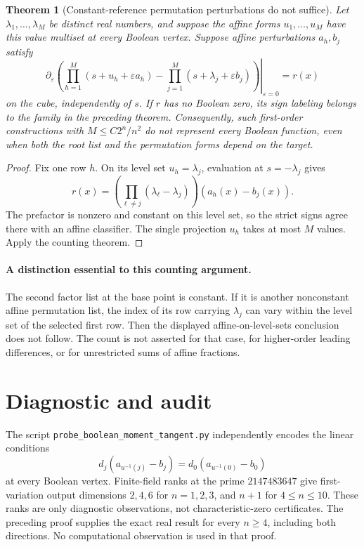 \documentclass[11pt]{article}
\newtheorem{theorem}{Theorem}
\begin{document}
\begin{theorem}[Constant-reference permutation perturbations do not suffice]
Let $\lambda_1,\ldots,\lambda_M$ be distinct real numbers, and suppose
the affine forms $u_1,\ldots,u_M$ have this value multiset at every
Boolean vertex. Suppose affine perturbations $a_h,b_j$ satisfy
\[
 \left.\partial_\varepsilon
 \left(\prod_{h=1}^M(s+u_h+\varepsilon a_h)
 -\prod_{j=1}^M(s+\lambda_j+\varepsilon b_j)\right)
 \right|_{\varepsilon=0}=r(x)
\]
on the cube, independently of $s$. If $r$ has no Boolean zero, its
sign labeling belongs to the family in the preceding theorem.
Consequently, such first-order constructions with
$M\le C2^n/n^2$ do not represent every Boolean function, even when
both the root list and the permutation forms depend on the target.
\end{theorem}
\begin{proof}
Fix one row $h$. On its level set $u_h=\lambda_j$, evaluation at
$s=-\lambda_j$ gives
\[
 r(x)=\left(\prod_{\ell\ne j}(\lambda_\ell-\lambda_j)\right)
       (a_h(x)-b_j(x)).
\]
The prefactor is nonzero and constant on this level set, so the
strict signs agree there with an affine classifier. The single
projection $u_h$ takes at most $M$ values. Apply the counting theorem.
\end{proof}

\paragraph{A distinction essential to this counting argument.}
The second factor list at the base point is constant. If it is another
nonconstant affine permutation list, the index of its row carrying
$\lambda_j$ can vary within the level set of the selected first row.
Then the displayed affine-on-level-sets conclusion does not follow.
The count is not asserted for that case, for higher-order leading
differences, or for unrestricted sums of affine fractions.

\section{Diagnostic and audit}

The script \texttt{probe\_boolean\_moment\_tangent.py} independently
encodes the linear conditions
\[
 d_j(a_{u^{-1}(j)}-b_j)=d_0(a_{u^{-1}(0)}-b_0)
\]
at every Boolean vertex. Finite-field ranks at the prime $2147483647$
give first-variation output dimensions $2,4,6$ for $n=1,2,3$, and
$n+1$ for $4\le n\le10$. These ranks are only diagnostic observations,
not characteristic-zero certificates. The preceding proof supplies
the exact real result for every $n\ge4$, including both directions.
No computational observation is used in that proof.
\end{document}
